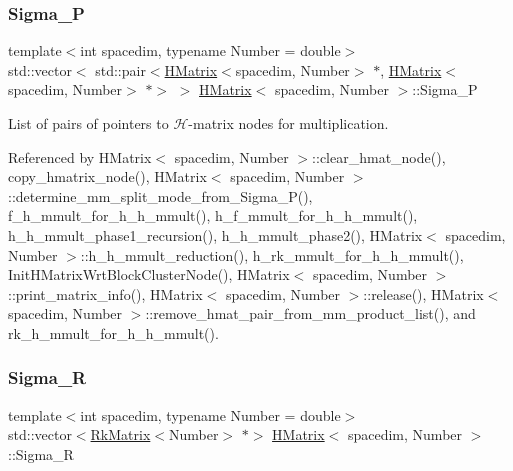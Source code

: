 \mbox{\label{classHMatrix_a3d96d0252ef8c873ae06cf87874acaf3}} 
\subsubsection{\texorpdfstring{Sigma\+\_\+P}{Sigma\_P}}
{\footnotesize\ttfamily template$<$int spacedim, typename Number = double$>$ \\
std\+::vector$<$ std\+::pair$<$\hyperlink{classHMatrix}{H\+Matrix}$<$spacedim, Number$>$ $\ast$, \hyperlink{classHMatrix}{H\+Matrix}$<$spacedim, Number$>$ $\ast$$>$ $>$ \hyperlink{classHMatrix}{H\+Matrix}$<$ spacedim, Number $>$\+::Sigma\+\_\+P\hspace{0.3cm}{\ttfamily [private]}}

List of pairs of pointers to $\mathcal{H}$-\/matrix nodes for multiplication. 

Referenced by H\+Matrix$<$ spacedim, Number $>$\+::clear\+\_\+hmat\+\_\+node(), copy\+\_\+hmatrix\+\_\+node(), H\+Matrix$<$ spacedim, Number $>$\+::determine\+\_\+mm\+\_\+split\+\_\+mode\+\_\+from\+\_\+\+Sigma\+\_\+\+P(), f\+\_\+h\+\_\+mmult\+\_\+for\+\_\+h\+\_\+h\+\_\+mmult(), h\+\_\+f\+\_\+mmult\+\_\+for\+\_\+h\+\_\+h\+\_\+mmult(), h\+\_\+h\+\_\+mmult\+\_\+phase1\+\_\+recursion(), h\+\_\+h\+\_\+mmult\+\_\+phase2(), H\+Matrix$<$ spacedim, Number $>$\+::h\+\_\+h\+\_\+mmult\+\_\+reduction(), h\+\_\+rk\+\_\+mmult\+\_\+for\+\_\+h\+\_\+h\+\_\+mmult(), Init\+H\+Matrix\+Wrt\+Block\+Cluster\+Node(), H\+Matrix$<$ spacedim, Number $>$\+::print\+\_\+matrix\+\_\+info(), H\+Matrix$<$ spacedim, Number $>$\+::release(), H\+Matrix$<$ spacedim, Number $>$\+::remove\+\_\+hmat\+\_\+pair\+\_\+from\+\_\+mm\+\_\+product\+\_\+list(), and rk\+\_\+h\+\_\+mmult\+\_\+for\+\_\+h\+\_\+h\+\_\+mmult().

\mbox{\label{classHMatrix_a04d341b4e606d1be2d71b8ea636efe7b}} 
\subsubsection{\texorpdfstring{Sigma\+\_\+R}{Sigma\_R}}
{\footnotesize\ttfamily template$<$int spacedim, typename Number = double$>$ \\
std\+::vector$<$\hyperlink{classRkMatrix}{Rk\+Matrix}$<$Number$>$ $\ast$$>$ \hyperlink{classHMatrix}{H\+Matrix}$<$ spacedim, Number $>$\+::Sigma\+\_\+R\hspace{0.3cm}{\ttfamily [private]}}

